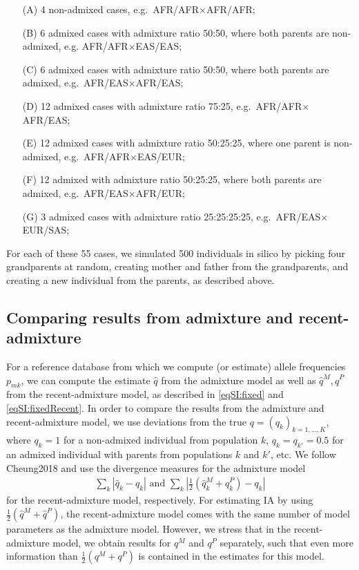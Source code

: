 \documentclass[12pt]{article}
\theoremstyle{definition}
\begin{document}
\begin{itemize}
\item[(A)] 4 non-admixed cases, e.g.\ AFR/AFR$\times$AFR/AFR;
\item[(B)] 6 admixed cases with admixture ratio 50:50, where both parents are non-admixed, e.g. AFR/AFR$\times$EAS/EAS;
\item[(C)] 6 admixed cases with admixture ratio 50:50, where both parents are admixed, e.g.\ AFR/EAS$\times$AFR/EAS;
\item[(D)] 12 admixed cases with admixture ratio 75:25, e.g.\ AFR/AFR$\times$AFR/EAS;
\item[(E)] 12 admixed cases with admixture ratio 50:25:25, where one parent is non-admixed, e.g.\ AFR/AFR$\times$EAS/EUR;
\item[(F)] 12 admixed with admixture ratio 50:25:25, where both parents are admixed, e.g.\ AFR/EAS$\times$AFR/EUR;
\item[(G)] 3 admixed cases with admixture ratio 25:25:25:25, e.g.\ AFR/EAS$\times$EUR/SAS;
\end{itemize}
For each of these 55 cases, we simulated 500 individuals in silico by picking four grandparents at random, creating mother and father from the grandparents, and creating a new individual from the parents, as described above.

\subsection{Comparing results from admixture and recent-admixture}
For a reference database from which we compute (or estimate) allele frequencies $p_{mk}$, we can {\color{blue} compute the} estimate {\color{blue}$\hat q$} from the admixture model as well as {\color{blue} $\hat q^M, \hat q^P$} from the recent-admixture model, as described in \eqref{eqSI:fixed} and \eqref{eqSI:fixedRecent}. In order to compare the results from the admixture and recent-admixture model, we use deviations from {\color{blue} the true} $q = (q_k)_{k=1,...,K}$, where $q_k = 1$ for a non-admixed individual from population $k$, $q_k =q_{k'} = 0.5$ for an admixed individual with parents from populations $k$ and $k'$, etc. We {\color{blue}follow \cite{article}{Cheung2018} and use the divergence measures} for the admixture model
\begin{align}
  \label{eq:error}
  \sum_k |\hat q_k - q_k| \text{  and }\sum_k |\tfrac 12 (\hat q_k^{M} + \hat q_k^{P}) - q_k|
\end{align}
for the recent-admixture model, respectively.  {\color{blue}For estimating IA by using $\tfrac 12 (\hat q^{M} + \hat q^{P})$, the recent-admixture model comes with the same number of model parameters as the admixture model.} However, we stress that in the recent-admixture model, we obtain results for $q^M$ and $q^P$ separately, such that even more information than $\tfrac 12 (q^{M} + q^{P})$ is contained in the estimates for this model.
\end{document}
